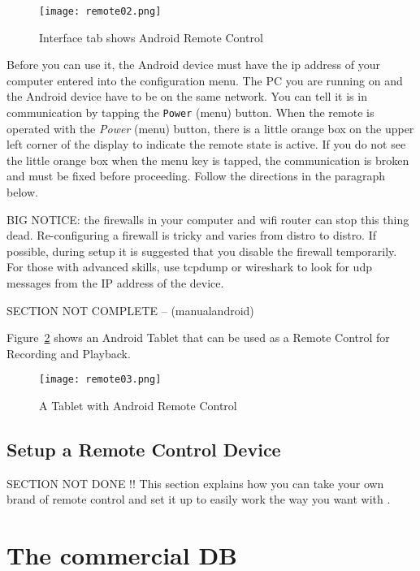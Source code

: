 \begin{figure}[htpb]
    \centering
    \texttt{[image: remote02.png]}
    \caption{Interface tab shows Android Remote Control}
    \label{fig:remote02}
\end{figure}

Before you can use it, the Android device must have the ip address of your computer entered into the configuration menu.  The PC you are running \CGG{} on and the Android device have to be on the same network.  You can tell it is in communication by tapping the \texttt{Power} (menu) button. When the remote is operated with the \textit{Power} (menu) button, there is a little orange box on the upper left corner of the display to indicate the remote state is active. If you do not see the little orange box when the menu key is tapped, the communication is broken and must be fixed before proceeding.   Follow the directions in the paragraph below.

BIG NOTICE:  the firewalls in your computer and wifi router can stop this thing dead.  Re-configuring a firewall is tricky and varies from distro to distro.  If possible, during setup it is suggested that you disable the firewall temporarily.  For those with advanced skills, use tcpdump or wireshark to look for udp messages from the IP address of the device.

SECTION NOT COMPLETE – (manualandroid)

Figure~\ref{fig:remote03} shows an Android Tablet that can be used as a Remote Control for \CGG{} Recording and Playback.

\begin{figure}[htpb]
    \centering
    \texttt{[image: remote03.png]}
    \caption{A Tablet with Android Remote Control}
    \label{fig:remote03}
\end{figure}

\subsection{Setup a Remote Control Device}%
\label{sub:setup_remote_control_device}

SECTION NOT DONE !! This section explains how you can take your own brand of remote control and set it up to easily work the way you want with \CGG{}.

\section{The commercial DB}%
\label{sec:commercial_db}

